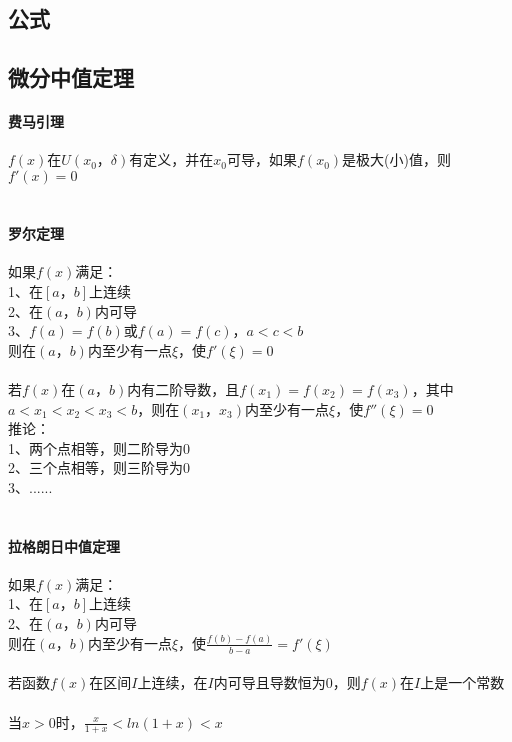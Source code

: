 \documentclass{article}
\begin{document}
\begin{flushleft}
	\LARGE
	
	\section{公式}
	
	\subsection{微分中值定理}
	
	\paragraph{费马引理}
	$f(x)$在$U(x_0，\delta)$有定义，并在$x_0$可导，如果$f(x_0)$是极大(小)值，则$f'(x)=0$\\
	~\\
	\paragraph{罗尔定理}
	如果$f(x)$满足：\\
	1、在$[a，b]$上连续\\
	2、在$(a，b)$内可导\\
	3、$f(a)=f(b)$或$f(a)=f(c)， a<c<b$\\
	则在$(a，b)$内至少有一点$\xi$，使$f'(\xi)=0$\\
	~\\
	若$f(x)$在$(a，b)$内有二阶导数，且$f(x_1)=f(x_2)=f(x_3)$，其中$a<x_1<x_2<x_3<b$，则在$(x_1，x_3)$内至少有一点$\xi$，使$f''(\xi)=0$\\
	推论：\\
	1、两个点相等，则二阶导为0\\
	2、三个点相等，则三阶导为0\\
	3、......\\
	~\\
	\paragraph{拉格朗日中值定理}
	如果$f(x)$满足：\\
	1、在$[a，b]$上连续\\
	2、在$(a，b)$内可导\\
	则在$(a，b)$内至少有一点$\xi$，使$\frac{f(b)-f(a)}{b-a}=f'(\xi)$\\
	~\\
	若函数$f(x)$在区间$I$上连续，在$I$内可导且导数恒为0，则$f(x)$在$I$上是一个常数\\
	~\\
	当$x>0$时，$\frac{x}{1+x}<ln(1+x)<x$\\
	~\\

\end{flushleft}
\end{document}
